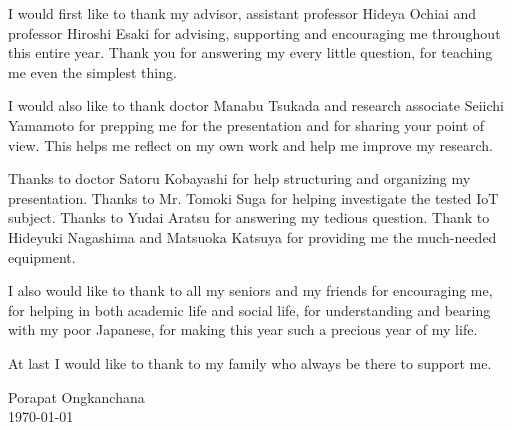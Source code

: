 I would first like to thank my advisor, assistant professor Hideya Ochiai and professor Hiroshi Esaki for advising, supporting and encouraging me throughout this entire year. Thank you for answering my every little question, for teaching me even the simplest thing.  

I would also like to thank doctor Manabu Tsukada and research associate Seiichi Yamamoto for prepping me for the presentation and for sharing your point of view. This helps me reflect on my own work and help me improve my research. 

Thanks to doctor Satoru Kobayashi for help structuring and organizing my presentation. Thanks to Mr. Tomoki Suga for helping investigate the tested IoT subject. Thanks to Yudai Aratsu for answering my tedious question. Thank to Hideyuki Nagashima and Matsuoka Katsuya for providing me the much-needed equipment.  

I also would like to thank to all my seniors and my friends for encouraging me, for helping in both academic life and social life, for understanding and bearing with my poor Japanese, for making this year such a precious year of my life. 

At last I would like to thank to my family who always be there to support me.  

\begin{flushright}
    Porapat Ongkanchana \\
    \today
\end{flushright}
